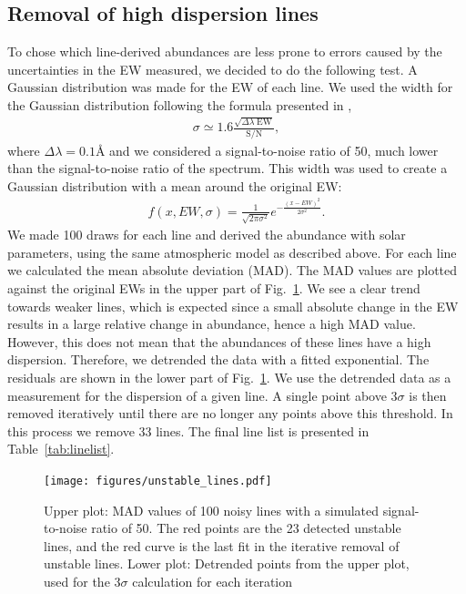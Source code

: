 \documentclass{aa}
\begin{document}
\subsection{Removal of high dispersion lines}
\label{sub:removal_of_unstable_lines}

To chose which line-derived abundances are less prone to errors caused
by the uncertainties in the EW measured, we decided to do the following
test. A Gaussian distribution was made for the EW of each line. We used
the width for the Gaussian distribution following the formula presented
in \citet{Caryel1988},
\begin{align}
    \sigma \simeq 1.6 \frac{\sqrt{\Delta\lambda\; \mathrm{EW}}}{\mathrm{S/N}},
\end{align}
where $\Delta\lambda=0.1\si{\angstrom}$ and we considered a
signal-to-noise ratio of 50, much lower than the signal-to-noise ratio
of the spectrum. This width was used to create a Gaussian distribution
with a mean around the original EW:
\begin{align}
    f(x, EW, \sigma) = \frac{1}{\sqrt{2\pi\sigma^2}} e^{-\frac{(x-EW)^2}{2\sigma^2}}.
\end{align}
We made 100 draws for each line and derived the abundance with solar
parameters, using the same atmospheric model as described above.
For each line we calculated the mean absolute deviation (MAD). The
MAD values are plotted against the original EWs in the upper part
of Fig.~\ref{fig:unstable_lines}. We see a clear trend towards
weaker lines, which is expected since a small absolute change in
the EW results in a large relative change in abundance, hence a high
MAD value. However, this does not mean that the abundances of these
lines have a high dispersion. Therefore, we detrended the data with
a fitted exponential. The residuals are shown in the lower part
of Fig.~\ref{fig:unstable_lines}. We use the detrended data as a
measurement for the dispersion of a given line. A single point above $3
\sigma$ is then removed iteratively until there are no longer any points
above this threshold. In this process we remove 33 lines. The final line
list is presented in Table~\ref{tab:linelist}.

\begin{figure}[tbp!]
    \centering
    \texttt{[image: figures/unstable\_lines.pdf]}
    \caption{Upper plot: MAD values of 100 noisy lines
    with a simulated signal-to-noise ratio of 50. The red points are
    the 23 detected unstable lines, and the red curve is the last fit
    in the iterative removal of unstable lines. Lower plot: Detrended points from the upper plot, used for the $3\sigma$
    calculation for each iteration}
    \label{fig:unstable_lines}
\end{figure}
\end{document}
